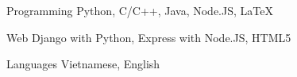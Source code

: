 


\begin{cvskills}


\cvskill
{Programming} %
{Python, C/C++, Java, Node.JS, LaTeX} %


\cvskill
{Web} %
{Django with Python, Express with Node.JS, HTML5} %


\cvskill
{Languages} %
{Vietnamese, English} %


\end{cvskills}
